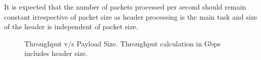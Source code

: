 It is expected that the number of packets processed per second should remain
constant irrespective of packet size as header processing is the main task and
size of the header is independent of packet size.
\begin{figure}[htbp]
    \centering
    \caption{ Throughput v/s Payload Size. Throughput calculation in Gbps includes header size.}
        \label{figurepayload}
    \end{figure}


